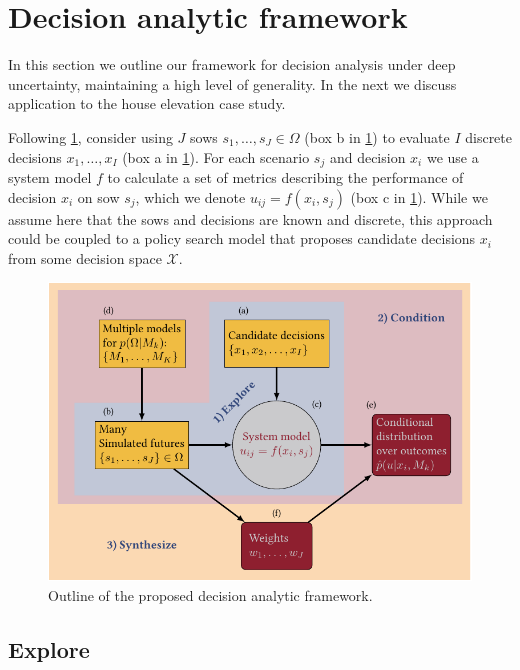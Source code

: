 \documentclass[12pt]{article}
\begin{document}
\section{Decision analytic framework}\label{sec:analysis}

In this section we outline our framework for decision analysis under deep uncertainty, maintaining a high level of generality.
In the next we discuss application to the house elevation case study.

Following \cref{fig:flowchart}, consider using $J$ \glspl{sow} $s_1, \ldots, s_J \in \Omega$ (box b in \cref{fig:flowchart}) to evaluate $I$ discrete decisions $x_1, \ldots, x_I$ (box a in \cref{fig:flowchart}).
For each scenario $s_j$ and decision $x_i$ we use a system model $f$ to calculate a set of metrics describing the performance of decision $x_i$ on \gls{sow} $s_j$, which we denote $u_{ij} = f(x_i, s_j)$ (box c in \cref{fig:flowchart}).
While we assume here that the \glspl{sow} and decisions are known and discrete, this approach could be  coupled to a policy search model that proposes candidate decisions $x_i$ from some decision space $\mathcal{X}$.

\begin{figure}
    \centering
    \includegraphics[width=\textwidth]{bayes-rdm.pdf}
    \caption{
        Outline of the proposed decision analytic framework.
    }\label{fig:flowchart}
\end{figure}

\subsection{Explore}\label{sec:analysis-explore}
\end{document}
